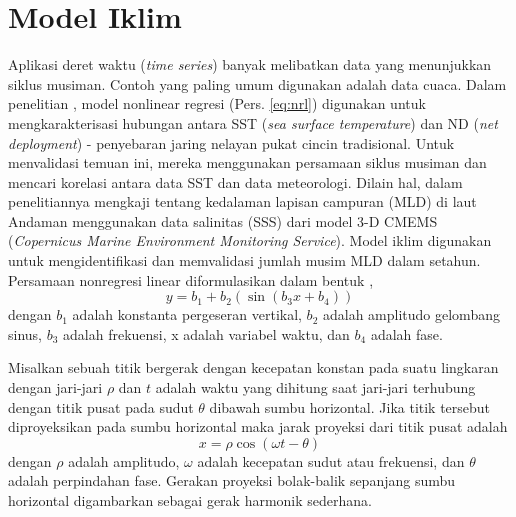 \section[Model Iklim]{Model Iklim}
\begin{spacing}{1.5}
	Aplikasi deret waktu (\textit{time series}) banyak melibatkan data yang menunjukkan siklus musiman. Contoh yang paling umum digunakan adalah data cuaca. Dalam penelitian , model nonlinear regresi (Pers. \ref{eq:nrl}) digunakan untuk mengkarakterisasi hubungan antara SST (\textit{sea surface temperature}) dan ND (\textit{net deployment}) - penyebaran jaring nelayan pukat cincin tradisional. Untuk menvalidasi temuan ini, mereka menggunakan persamaan siklus musiman  dan mencari korelasi antara data SST dan data meteorologi. Dilain hal,  dalam penelitiannya mengkaji tentang kedalaman lapisan campuran (MLD) di laut Andaman menggunakan data salinitas (SSS) dari model 3-D CMEMS (\textit{Copernicus Marine Environment Monitoring Service}). Model iklim digunakan untuk mengidentifikasi dan memvalidasi jumlah musim MLD dalam setahun. Persamaan nonregresi linear  diformulasikan dalam bentuk ,
	\begin{equation}\label{eq:nrl}
		y = b_1 + b_2(\sin(b_3x+b_4))
	\end{equation}
	dengan $b_1$ adalah konstanta pergeseran vertikal, $b_2$ adalah amplitudo gelombang sinus, $b_3$ adalah frekuensi, x adalah variabel waktu, dan $b_4$ adalah fase.
	
	Misalkan sebuah titik bergerak dengan kecepatan konstan pada suatu lingkaran dengan jari-jari $\rho$ dan $t$ adalah waktu yang dihitung saat jari-jari terhubung dengan titik pusat pada sudut $\theta$ dibawah sumbu horizontal. Jika titik tersebut diproyeksikan pada sumbu horizontal maka jarak proyeksi dari titik pusat adalah 
	\begin{equation}\label{eq:MIK1}
		x = \rho \cos(\omega t-\theta)
	\end{equation}
	dengan $\rho$ adalah amplitudo, $\omega$ adalah kecepatan sudut atau frekuensi, dan $\theta$ adalah perpindahan fase. Gerakan proyeksi bolak-balik sepanjang sumbu horizontal digambarkan sebagai gerak harmonik sederhana.
	

\end{spacing}
